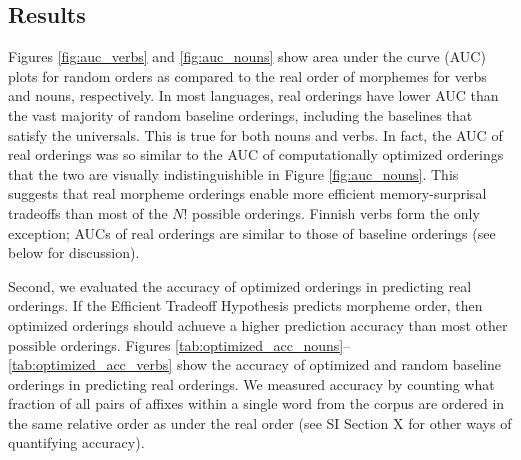 \documentclass[11pt,letterpaper]{article}
\newcommand{\citet}{\Textcite}
\newcommand\becky[1]{{\color{blue}(#1)}}
\newcounter{def}
\begin{document}



\subsection{Results}

Figures \ref{fig:auc_verbs} and \ref{fig:auc_nouns} show area under the curve (AUC) plots for random orders as compared to the real order of morphemes for verbs and nouns, respectively.
In most languages, real orderings have lower AUC than the vast majority of random baseline orderings, including the baselines that satisfy the universals. This is true for both nouns and verbs. In fact, the AUC of real orderings was so similar to the AUC of computationally optimized orderings that the two are visually indistinguishible in Figure  \ref{fig:auc_nouns}. This suggests that real morpheme orderings enable more efficient memory-surprisal tradeoffs than most of the $N!$ possible orderings.
Finnish verbs form the only exception; AUCs of real orderings are similar to those of baseline orderings (see below for discussion).

Second, we evaluated the accuracy of optimized orderings in predicting real orderings.
If the Efficient Tradeoff Hypothesis predicts morpheme order, then optimized orderings should achueve a higher prediction accuracy than most other possible orderings.
Figures \ref{tab:optimized_acc_nouns}--\ref{tab:optimized_acc_verbs} show the accuracy of optimized and random baseline orderings in predicting real orderings. 
We measured accuracy by counting what fraction of all pairs of affixes within a single word from the corpus are ordered in the same relative order as under the real order (see SI Section X for other ways of quantifying accuracy).
\end{document}
